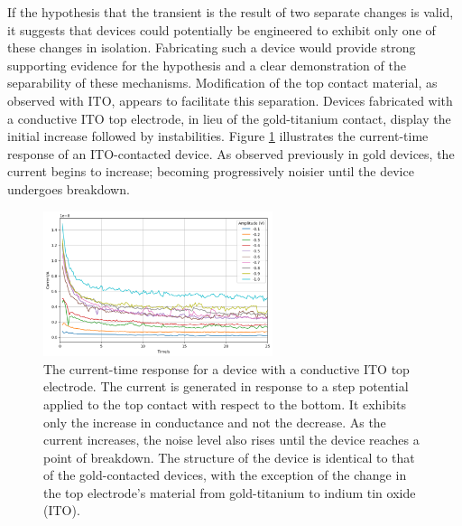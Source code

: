 \noindent If the hypothesis that the transient is the result of two separate changes is valid, it suggests that devices could potentially be engineered to exhibit only one of these changes in isolation. Fabricating such a device would provide strong supporting evidence for the hypothesis and a clear demonstration of the separability of these mechanisms. Modification of the top contact material, as observed with ITO, appears to facilitate this separation. Devices fabricated with a conductive ITO top electrode, in lieu of the gold-titanium contact, display the initial increase followed by instabilities. Figure \ref{fig:5b} illustrates the current-time response of an ITO-contacted device. As observed previously in gold devices, the current begins to increase; becoming progressively noisier until the device undergoes breakdown.\\

\begin{figure}[htbp!] 
    \centering    
    \includegraphics[width=0.6\textwidth]{Chapter5/Figs/b.png}
    \caption[The current-time response for a device with a conductive ITO top electrode.]{The current-time response for a device with a conductive ITO top electrode. The current is generated in response to a step potential applied to the top contact with respect to the bottom. It exhibits only the increase in conductance and not the decrease. As the current increases, the noise level also rises until the device reaches a point of breakdown. The structure of the device is identical to that of the gold-contacted devices, with the exception of the change in the top electrode's material from gold-titanium to indium tin oxide (ITO).}
    \label{fig:5b}
\end{figure}



